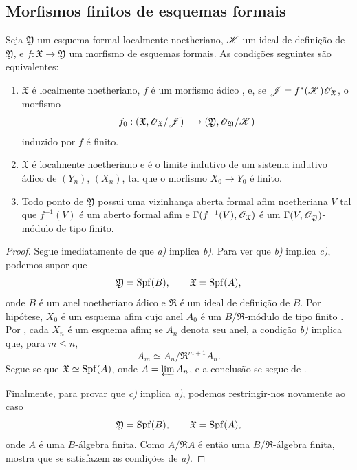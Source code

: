 \subsection{Morfismos finitos de esquemas formais}
\label{subsection:III.4.8}

\begin{proposition}[4.8.1]
\label{III.4.8.1}
Seja $\mathfrak{Y}$ um esquema formal localmente noetheriano,
$\mathscr{K}$ um ideal de definição de $\mathfrak{Y}$, e
$f:\mathfrak{X}\to\mathfrak{Y}$ um morfismo de esquemas formais.
As condições seguintes são equivalentes:
\begin{enumerate}
  \item[\rm{a)}] $\mathfrak{X}$ é localmente noetheriano, $f$ é um
    morfismo ádico , e, se
    $\mathscr{J}=f^*(\mathscr{K})\mathscr{O}_{\mathfrak{X}}$, o morfismo
    \[
      f_0:
      (\mathfrak{X},\mathscr{O}_{\mathfrak{X}}/\mathscr{J})
      \longrightarrow
      (\mathfrak{Y},\mathscr{O}_{\mathfrak{Y}}/\mathscr{K})
    \]
    induzido por $f$ é finito.
  \item[\rm{b)}] $\mathfrak{X}$ é localmente noetheriano e é o
    limite indutivo de um sistema indutivo ádico de $(Y_n)$, $(X_n)$,
    tal que o morfismo $X_0\to Y_0$ é finito.
  \item[\rm{c)}] Todo ponto de $\mathfrak{Y}$ possui uma vizinhança aberta
    formal afim noetheriana $V$ tal que $f^{-1}(V)$ é
    um aberto formal afim e
    $\Gamma(f^{-1}(V),\mathscr{O}_{\mathfrak{X}})$ é um
    $\Gamma(V,\mathscr{O}_{\mathfrak{Y}})$-módulo de tipo finito.
\end{enumerate}
\end{proposition}

\begin{proof}
Segue imediatamente de  que \emph{a)} implica
\emph{b)}. Para ver que \emph{b)} implica \emph{c)}, podemos supor
que
\[
  \mathfrak{Y}=\operatorname{Spf}(B),\qquad \mathfrak{X}=\operatorname{Spf}(A),
\]
onde $B$ é um anel noetheriano ádico e $\mathfrak{R}$ é um ideal
de definição de $B$. Por hipótese, $X_0$ é um esquema afim
cujo anel $A_0$ é um $B/\mathfrak{R}$-módulo de tipo finito
. Por , cada $X_n$ é um esquema
afim; se $A_n$ denota seu anel, a condição \emph{b)} implica que,
para $m\leq n$,
\[
  A_m\simeq A_n/\mathfrak{R}^{m+1}A_n.
\]
Segue-se que $\mathfrak{X}\simeq\operatorname{Spf}(A)$, onde
$A=\varprojlim A_n$, e a conclusão se segue de
.

Finalmente, para provar que \emph{c)} implica \emph{a)}, podemos restringir-nos
novamente ao caso
\[
  \mathfrak{Y}=\operatorname{Spf}(B),\qquad \mathfrak{X}=\operatorname{Spf}(A),
\]
onde $A$ é uma $B$-álgebra finita. Como
$A/\mathfrak{R}A$ é então uma
$B/\mathfrak{R}$-álgebra finita,  mostra que se
satisfazem as condições de \emph{a)}.
\end{proof}

